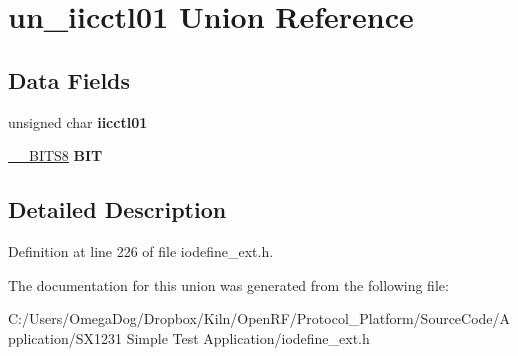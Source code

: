\hypertarget{unionun__iicctl01}{\section{un\-\_\-iicctl01 Union Reference}
\label{unionun__iicctl01}
}
\subsection*{Data Fields}
\begin{DoxyCompactItemize}
\item 
\hypertarget{unionun__iicctl01_a2ac857eb6590da39989b4bd9d3651a3b}{unsigned char {\bfseries iicctl01}}\label{unionun__iicctl01_a2ac857eb6590da39989b4bd9d3651a3b}

\item 
\hypertarget{unionun__iicctl01_a54709e013b1d847eaae2a009585b87cf}{\hyperlink{struct_____b_i_t_s8}{\-\_\-\-\_\-\-B\-I\-T\-S8} {\bfseries B\-I\-T}}\label{unionun__iicctl01_a54709e013b1d847eaae2a009585b87cf}

\end{DoxyCompactItemize}


\subsection{Detailed Description}


Definition at line 226 of file iodefine\-\_\-ext.\-h.



The documentation for this union was generated from the following file\-:\begin{DoxyCompactItemize}
\item 
C\-:/\-Users/\-Omega\-Dog/\-Dropbox/\-Kiln/\-Open\-R\-F/\-Protocol\-\_\-\-Platform/\-Source\-Code/\-Application/\-S\-X1231 Simple Test Application/iodefine\-\_\-ext.\-h\end{DoxyCompactItemize}
